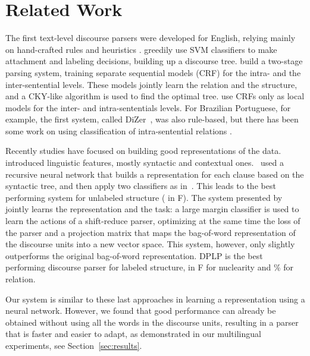 \documentclass[11pt]{article}
\begin{document}
\section{Related Work}
\label{sec:related}


The first text-level discourse parsers were developed for English, relying mainly on hand-crafted rules and heuristics \cite{marcu:rhetorical:2000,carlson:building:2001}. 
 greedily use SVM classifiers to make attachment and labeling decisions, building up a discourse tree.   build a two-stage parsing system, training separate sequential models (CRF) for the intra- and the inter-sentential levels. These models jointly learn  the relation and the structure, and a CKY-like algorithm is used to find the optimal tree.  use CRFs only as local models for the inter- and intra-sententials levels. 
For Brazilian Portuguese, for example, the first system, called DiZer~\cite{pardo:development:2008,maziero:dizer:2011}, was also rule-based, but there has been some work on using classification of intra-sentential relations \cite{maziero:adaptation:2015}. 

Recently studies have focused on building good representations of the data.  introduced linguistic features, mostly syntactic and contextual ones. ~used a recursive neural network that builds a representation for each clause based on the syntactic tree, and then apply two classifiers as in~. This leads to the best performing system for unlabeled structure ( in F). The system presented by~ jointly learns the representation and the task: a large margin classifier is used to learn the actions of a shift-reduce parser, optimizing at the same time the loss of the parser and a projection matrix that maps the bag-of-word representation of the discourse units into a new vector space. 
This system, however, only slightly outperforms the original bag-of-word representation. 
DPLP is the best performing discourse parser for labeled structure,  in F for nuclearity and \% for relation.

Our system is similar to these last approaches in learning a representation using a neural network.  
However, we found that good performance can already be obtained without using all the words in the discourse units, resulting in a parser that is faster and easier to adapt, as demonstrated in our multilingual experiments,  see Section~\ref{sec:results}. 
\end{document}
